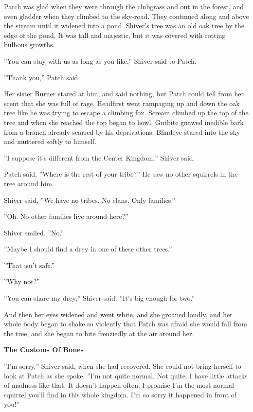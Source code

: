 \documentclass[11pt]{article}
\begin{document}
 Patch was glad when they were through the clubgrass and out in the forest, and even gladder when they climbed to the sky-road. They continued along and above the stream until it widened into a pond. Shiver's tree was an old oak tree by the edge of the pond. It was tall and majestic, but it was covered with rotting bulbous growths.\par
 ''You can stay with us as long as you like,'' Shiver said to Patch.\par
 ''Thank you,'' Patch said.\par
 Her sister Burner stared at him, and said nothing, but Patch could tell from her scent that she was full of rage. Headfirst went rampaging up and down the oak tree like he was trying to escape a climbing fox. Scream climbed up the top of the tree and when she reached the top began to howl. Gutbite gnawed inedible bark from a branch already scarred by his deprivations. Blindeye stared into the sky and muttered softly to himself.\par
''I suppose it's different from the Center Kingdom,'' Shiver said.\par
Patch said, ''Where is the rest of your tribe?'' He saw no other squirrels in the tree around him.\par
Shiver said, ''We have no tribes. No clans. Only families.''\par
''Oh. No other families live around here?''\par
Shiver smiled. ''No.''\par
''Maybe I should find a drey in one of these other trees.''\par
''That isn't safe.''\par
''Why not?''\par
''You can share my drey,'' Shiver said. ''It's big enough for two.''\par
And then her eyes widened and went white, and she groaned loudly, and her whole body began to shake so violently that Patch was afraid she would fall from the tree, and she began to bite frenziedly at the air around her.\par
\par
{\bf The Customs Of Bones\par
}\par
 ''I'm sorry,'' Shiver said, when she had recovered. She could not bring herself to look at Patch as she spoke. ''I'm not quite normal. Not quite. I have little attacks of madness like that. It doesn't happen often. I promise I'm the most normal squirrel you'll find in this whole kingdom. I'm so sorry it happened in front of you!''\par
\end{document}
